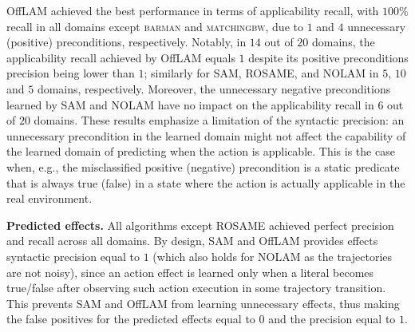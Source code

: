 \documentclass[letterpaper]{article} %
\newcommand{\nolam}{NOLAM\xspace}
\newcommand{\offlam}{OffLAM\xspace}
\newcommand{\rosame}{ROSAME\xspace}
\newcommand{\samshort}{SAM\xspace}
\newcommand{\miniparagraph}[1]{\textbf{#1.}}
\newif\ifaddcomments
\newcommand{\roni}[1]{\ifaddcomments{\textcolor{red}{[Roni: #1]}}\fi}
\newcommand{\leo}[1]{\ifaddcomments{\textcolor{pink}{[Leonardo: #1]}}\fi}
\begin{document}

\offlam achieved the best performance in terms of applicability recall, with $100\%$ recall in all domains except \textsc{barman} and \textsc{matchingbw}, due to $1$ and $4$ unnecessary (positive) preconditions, respectively. 
%
Notably, in $14$ out of $20$ domains, the applicability recall achieved by \offlam equals $1$ despite its positive preconditions precision being lower than $1$; similarly for \samshort, \rosame, and \nolam in $5$, $10$ and $5$ domains, respectively. 
Moreover, the unnecessary negative preconditions learned by \samshort and \nolam have no impact on the applicability recall in $6$ out of $20$ domains. 
These results emphasize a limitation of the syntactic precision: an unnecessary precondition in the learned domain might not affect the capability of the learned domain of predicting when the action is applicable. 
This is the case when, e.g., the misclassified positive (negative) precondition is a static predicate that is always true (false) in a state where the action is actually applicable in the real environment.


\miniparagraph{Predicted effects} 
All algorithms except \rosame achieved perfect precision and recall across all domains. 
By design, \samshort and \offlam provides effects syntactic precision equal to $1$ (which also holds for \nolam as the trajectories are not noisy), since an action effect is learned only when a literal becomes true/false after observing such action execution in some trajectory transition. This prevents \samshort and \offlam from learning unnecessary effects, thus making the false positives for the predicted effects equal to $0$ and the precision equal to $1$. 
\end{document}
